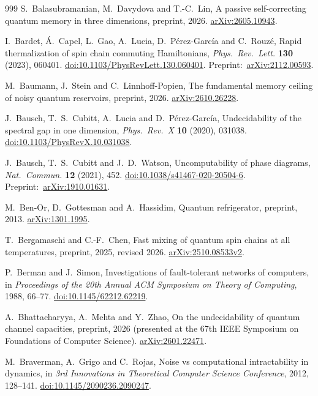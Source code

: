 \begin{thebibliography}{999}
S.~Balasubramanian, M.~Davydova and T.-C.~Lin,
A passive self-correcting quantum memory in three dimensions,
preprint, 2026.
\href{https://arxiv.org/abs/2605.10943}{arXiv:2605.10943}.

I.~Bardet, \'A.~Capel, L.~Gao, A.~Lucia,
D.~P\'erez-Garc\'ia and C.~Rouz\'e,
Rapid thermalization of spin chain commuting Hamiltonians,
\emph{Phys.~Rev.~Lett.} \textbf{130} (2023), 060401.
\href{https://doi.org/10.1103/PhysRevLett.130.060401}{doi:10.1103/PhysRevLett.130.060401}.
Preprint:~\href{https://arxiv.org/abs/2112.00593}{arXiv:2112.00593}.

M.~Baumann, J.~Stein and C.~Linnhoff-Popien,
The fundamental memory ceiling of noisy quantum reservoirs,
preprint, 2026.
\href{https://arxiv.org/abs/2610.26228}{arXiv:2610.26228}.

J.~Bausch, T.~S.~Cubitt, A.~Lucia and D.~P\'erez-Garc\'ia,
Undecidability of the spectral gap in one dimension,
\emph{Phys.~Rev.~X} \textbf{10} (2020), 031038.
\href{https://doi.org/10.1103/PhysRevX.10.031038}{doi:10.1103/PhysRevX.10.031038}.

J.~Bausch, T.~S.~Cubitt and J.~D.~Watson,
Uncomputability of phase diagrams,
\emph{Nat.~Commun.} \textbf{12} (2021), 452.
\href{https://doi.org/10.1038/s41467-020-20504-6}{doi:10.1038/s41467-020-20504-6}.
Preprint:~\href{https://arxiv.org/abs/1910.01631}{arXiv:1910.01631}.

M.~Ben-Or, D.~Gottesman and A.~Hassidim,
Quantum refrigerator,
preprint, 2013.
\href{https://arxiv.org/abs/1301.1995}{arXiv:1301.1995}.

T.~Bergamaschi and C.-F.~Chen,
Fast mixing of quantum spin chains at all temperatures,
preprint, 2025, revised 2026.
\href{https://arxiv.org/abs/2510.08533v2}{arXiv:2510.08533v2}.

P.~Berman and J.~Simon,
Investigations of fault-tolerant networks of computers,
in \emph{Proceedings of the 20th Annual ACM Symposium on Theory of Computing},
1988, 66--77.
\href{https://doi.org/10.1145/62212.62219}{doi:10.1145/62212.62219}.

A.~Bhattacharyya, A.~Mehta and Y.~Zhao,
On the undecidability of quantum channel capacities,
preprint, 2026 (presented at the 67th IEEE Symposium on Foundations of Computer Science).
\href{https://arxiv.org/abs/2601.22471}{arXiv:2601.22471}.

M.~Braverman, A.~Grigo and C.~Rojas,
Noise vs computational intractability in dynamics,
in \emph{3rd Innovations in Theoretical Computer Science Conference},
2012, 128--141.
\href{https://doi.org/10.1145/2090236.2090247}{doi:10.1145/2090236.2090247}.


\end{thebibliography}
